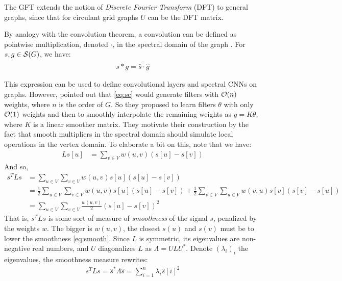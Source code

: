 \begin{remark}
The GFT extends the notion of \emph{Discrete Fourier Transform} (DFT) to general graphs, since that for circulant grid graphs $U$ can be the DFT matrix.
\end{remark}

By analogy with the convolution theorem, a convolution can be defined as pointwise multiplication, denoted $\cdot$, in the spectral domain of the graph \citep{hammond2011wavelets}. For $s, g \in \mathcal{S}(G)$, we have:
\begin{gather}
s \ast g = \widetilde{\widehat{s} \cdot \widehat{g}} \label{eq:sc}
\end{gather}

This expression can be used to define convolutional layers and spectral CNNs on graphs. However, \cite{bruna2013spectral} pointed out that \eqref{eq:sc} would generate filters with $\mathcal{O}(n)$ weights, where $n$ is the order of $G$. So they proposed to learn filters $\theta$ with only $\mathcal{O}(1)$ weights and then to smoothly interpolate the remaining weights as $g = K \theta$, where $K$ is a linear smoother matrix. They motivate their construction by the fact that smooth multipliers in the spectral domain should simulate local operations in the vertex domain. To elaborate a bit on this, note that we have:
\begin{align}
Ls[u] &= \displaystyle\sum_{v \in V} w(u,v)(s[u] - s[v])
\end{align}
And so,
\begin{align}
s^TLs &= \displaystyle\sum_{u \in V}\sum_{v \in V} w(u,v)s[u](s[u] - s[v])\nonumber\\
&= \displaystyle \frac{1}2\sum_{u \in V}\sum_{v \in V} w(u,v)s[u](s[u] - s[v]) + \frac{1}2\sum_{v \in V}\sum_{u \in V} w(v,u)s[v](s[v] - s[u])\nonumber\\
&=  \displaystyle\sum_{u \in V}\sum_{v \in V} \frac{w(u,v)}2(s[u] - s[v])^2 \label{eq:smooth}
\end{align}
That is, $s^TLs$ is some sort of measure of \emph{smoothness} of the signal $s$, penalized by the weights $w$. The bigger is $w(u,v)$, the closest $s(u)$ and $s(v)$ must be to lower the smoothness \eqref{eq:smooth}. Since $L$ is symmetric, its eigenvalues are non-negative real numbers, and $U$ diagonalizes $L$ as $\Lambda = ULU^*$. Denote $(\lambda_i)_i$ the eigenvalues, the smoothness measure rewrites:
\begin{align}
s^TLs = \widehat{s}^*\Lambda\widehat{s} = \displaystyle\sum_{i=1}^n \lambda_i \widehat{s}[i]^2
\end{align}
